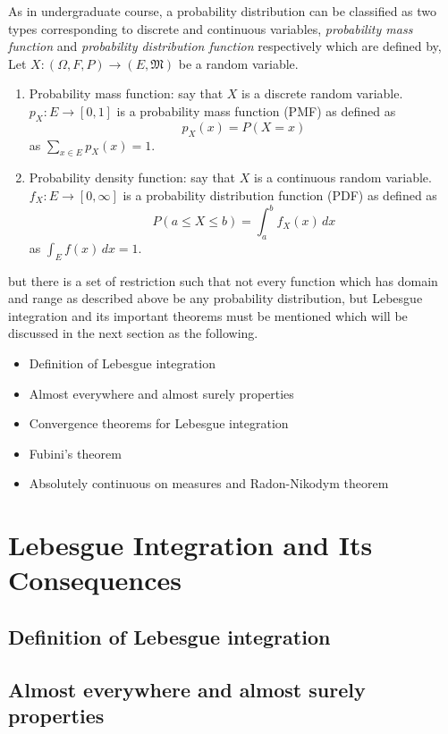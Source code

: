\documentclass[12pt, a4paper]{report}
\begin{document}
    As in undergraduate course, a probability distribution can be classified as two types corresponding to discrete and continuous variables, \emph{probability mass function} and \emph{probability distribution function} respectively which are defined by,\\[6pt]

    Let $X: (\Omega, F, P) \to (E, \mathfrak{M})$ be a random variable. 

    \begin{enumerate}
        \item Probability mass function: say that $X$ is a discrete random variable. $p_X: E \rightarrow [0,1]$ is a probability mass function (PMF) as defined as
        $$p_X(x) = P(X = x)$$
        as $\sum_{x \in E} p_X(x) = 1$.\
        \item Probability density function: say that $X$ is a continuous random variable. $f_X: E \rightarrow [0, \infty]$ is a probability distribution function (PDF) as defined as $$P(a \leq X \leq b) = \int_a^b f_X(x)\,dx$$ as $\int_E f(x)\,dx = 1.$
    \end{enumerate}
    but there is a set of restriction such that not every function which has domain and range as described above be any probability distribution, but Lebesgue integration and its important theorems must be mentioned which will be discussed in the next section as the following.

    \begin{itemize}
        \item Definition of Lebesgue integration
        \item Almost everywhere and almost surely properties
        \item Convergence theorems for Lebesgue integration
        \item Fubini's theorem
        \item Absolutely continuous on measures and Radon-Nikodym theorem 
    \end{itemize}

    \section{Lebesgue Integration and Its Consequences}
    \subsection{Definition of Lebesgue integration}
    \subsection{Almost everywhere and almost surely properties}
\end{document}
